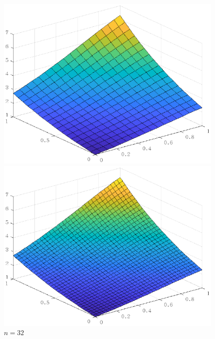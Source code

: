 \documentclass[lang=cn,11pt,a4paper]{elegantpaper}
\begin{document}
\begin{figure}[htbp]
  \centering
  \begin{minipage}[t]{0.24\linewidth}
      \centering
      \includegraphics[width=0.95\linewidth]{figure/result_problem1_D_r_n=16.eps}
      \caption*{$n=16$}
  \end{minipage}
  \begin{minipage}[t]{0.24\linewidth}
    \centering
    \includegraphics[width=0.95\linewidth]{figure/result_problem1_D_r_n=32.eps}
    \caption*{$n=32$}
  \end{minipage}
  \begin{minipage}[t]{0.24\linewidth}
    \centering

\end{minipage}
\end{figure}
\end{document}
